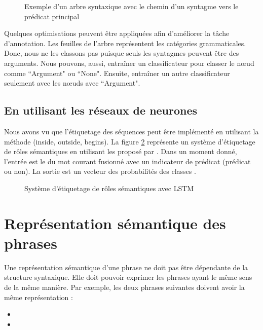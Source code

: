\documentclass{KodeBook}
\begin{document}
\begin{figure}[ht]
	\centering
	\caption[Exemple d'un arbre syntaxique avec le chemin vers le prédicat principal]{Exemple d'un arbre syntaxique avec le chemin d'un syntagme vers le prédicat principal \cite{2019-jurafsky-martin}}
	\label{fig:srl-arbre-chemin}
\end{figure}

Quelques optimisations peuvent être appliquées afin d'améliorer la tâche d'annotation.
Les feuilles de l'arbre représentent les catégories grammaticales. 
Donc, nous ne les classons pas puisque seuls les syntagmes peuvent être des arguments. 
Nous pouvons, aussi, entraîner un classificateur pour classer le nœud comme ``Argument" ou ``None".
Ensuite, entraîner un autre classificateur seulement avec les nœuds avec ``Argument".


\subsection{En utilisant les réseaux de neurones}

Nous avons vu que l'étiquetage des séquences peut être implémenté en utilisant la méthode   (inside, outside, begins). 
La figure \ref{fig:srl-embedding} représente un système d'étiquetage de rôles sémantiques en utilisant les  proposé par \citet{2017-he-al}. 
Dans un moment donné, l'entrée est le  du mot courant fusionné avec un indicateur de prédicat (prédicat ou non). 
La sortie est un vecteur des probabilités des classes .

\begin{figure}[ht]
	\centering
	\caption[Système d'étiquetage de rôles sémantiques avec LSTM]{Système d'étiquetage de rôles sémantiques avec LSTM \cite{2017-he-al}}
	\label{fig:srl-embedding}
\end{figure}

\section{Représentation sémantique des phrases}

Une représentation sémantique d'une phrase ne doit pas être dépendante de la structure syntaxique. 
Elle doit pouvoir exprimer les phrases ayant le même sens de la même manière. 
Par exemple, les deux phrases suivantes doivent avoir la même représentation :
\begin{itemize}
	\item {}
	\item {}
\end{itemize}
\end{document}
